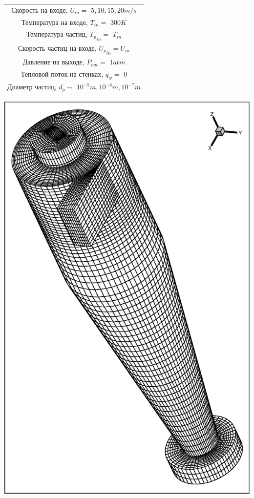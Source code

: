 \begin{minipage}{0.6\textwidth}
    \label{cycloneBC}
	\begin{tabular}{c}
		\hline
		\label{geometrytable}
		Скорость на входе, $U_{in}=$  $5, 10, 15, 20 m/s$ \\
		Температура на входе, $T_{in}=$  $300 K$ \\
		Температура частиц, ${T_p}_{in}=$  $T_{in}$ \\
		Скорость частиц на входе, ${U_p}_{in} = U_{in}$ \\
		Давление на выходе, $P_{out}=$  $1atm$ \\
		Тепловой поток на стенках, $q_w=$  $0$ \\
		Диаметр частиц, $d_p \sim $ $10^{-5}m, 10^{-6}m, 10^{-7}	m$\\
	\end{tabular}
\end{minipage}
\hspace{2em}
\begin{minipage}{0.35\textwidth}
    \includegraphics[scale=0.45]{meshCyclone}
	\label{fig:cycloneMesh}
\end{minipage}
\vspace{1em}  
